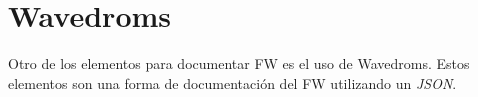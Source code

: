 \section{Wavedroms}

Otro de los elementos para documentar FW es el uso de Wavedroms. Estos elementos son una forma
de documentación del FW utilizando un \textit{JSON}.

